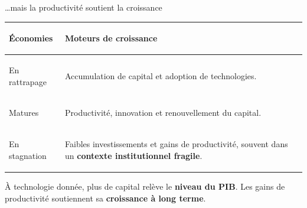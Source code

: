 \documentclass[aspectratio=169]{beamer}
\begin{document}
\begin{frame}{\ldots mais la productivité soutient la croissance}
   \small
   \renewcommand{\arraystretch}{1.35}
   \begin{tabularx}{\textwidth}{@{}>{\bfseries\raggedright\arraybackslash}p{}J@{}}
      \toprule
      Économies & Moteurs de croissance \\
      \midrule
      \textcolor{HECgreen}{En rattrapage} & Accumulation de capital et adoption de technologies. \\
      \addlinespace[9pt]
      \textcolor{HECnavy}{Matures} & Productivité, innovation et renouvellement du capital. \\
      \addlinespace[9pt]
      \textcolor{HECcoral}{En stagnation} & Faibles investissements et gains de productivité, souvent dans un \textbf{contexte institutionnel fragile}. \\
      \bottomrule
   \end{tabularx}
   \vspace{0.22cm}
   \begin{keyinsight}
      \RaggedRight\small À technologie donnée, plus de capital relève le \textbf{niveau du PIB}. Les gains de productivité soutiennent sa \textbf{croissance à long terme}.
   \end{keyinsight}
\end{frame}

\end{document}
